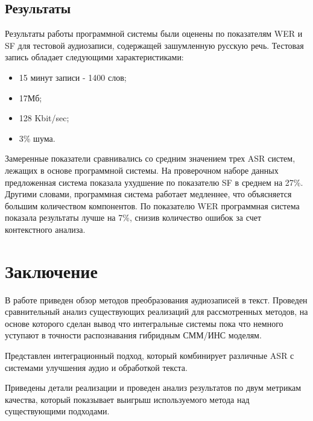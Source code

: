 \documentclass[conference]{IEEEtran}
\begin{document}
\subsection{Результаты}
Результаты работы программной системы были оценены по показателям WER и SF для тестовой аудиозаписи, содержащей зашумленную русскую речь.
Тестовая запись обладает следующими характеристиками:

\begin{itemize}
\item 15 минут записи - 1400 слов;
\item 17Мб;
\item 128 Kbit/sec;
\item 3\% шума.
\end{itemize}

Замеренные показатели сравнивались со средним значением трех ASR систем, лежащих в основе программной системы.
На проверочном наборе данных предложенная система показала ухудшение по показателю SF в среднем на 27\%.
Другими словами, программная система работает медленнее, что объясняется большим количеством компонентов.
По показателю WER программная система показала результаты лучше на 7\%, снизив количество ошибок за счет контекстного анализа.

\section{Заключение}
В работе приведен обзор методов преобразования аудиозаписей в текст. Проведен сравнительный анализ существующих реализаций для рассмотренных методов, на основе которого сделан вывод что интегральные системы пока что немного уступают в точности распознавания гибридным СММ/ИНС моделям.

Представлен интеграционный подход, который комбинирует различные ASR с системами улучшения аудио и обработкой текста.

Приведены детали реализации и проведен анализ результатов по двум метрикам качества, который показывает выигрыш используемого метода над существующими подходами.
\end{document}
